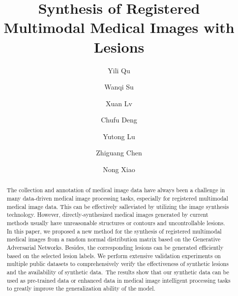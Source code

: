 \documentclass[runningheads]{llncs}
\begin{document}
	\title{Synthesis of Registered Multimodal
		Medical Images with Lesions}
	\author{ Yili Qu \and Wanqi Su \and Xuan Lv \and Chufu Deng 
		\and Yutong Lu \and Zhiguang Chen \and Nong Xiao}
	\maketitle       %
	\begin{abstract}
		The collection and annotation of medical image data have always been a challenge in many data-driven medical image processing tasks, especially for registered multimodal medical image data. This can be effectively salleviated by utilizing the image synthesis technology. However, directly-synthesized medical images generated by current methods usually have unreasonable structures or contours and uncontrollable lesions. In this paper, we proposed a new method for the synthesis of registered multimodal medical images from a random normal distribution matrix based on the Generative Adversarial Networks. Besides, the corresponding lesions can be generated efficiently based on the selected lesion labels. We perform extensive validation experiments on multiple public datasets to comprehensively verify the effectiveness of synthetic lesions and the availability of synthetic data. The results show that our synthetic data can be used as pre-trained data or enhanced data in medical image intelligent processing tasks to greatly improve the generalization ability of the model. 
		
	\end{abstract}
\end{document}
